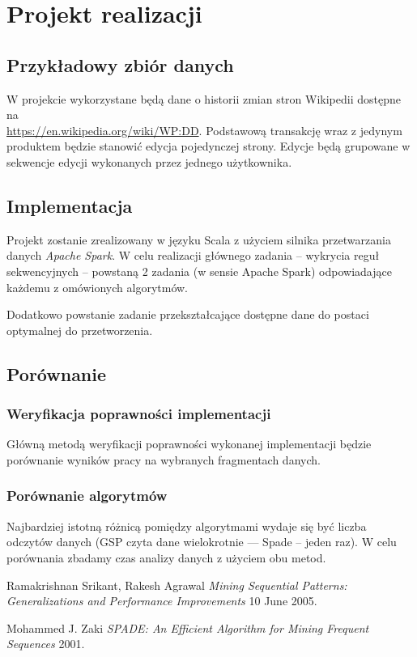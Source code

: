 \documentclass[paper=a4, fontsize=11pt]{scrartcl} %
\numberwithin{equation}{section} %
\numberwithin{figure}{section} %
\numberwithin{table}{section} %
\begin{document}
\section{Projekt realizacji}
\subsection{Przykładowy zbiór danych}
W projekcie wykorzystane będą dane o historii zmian stron Wikipedii dostępne na \\\hyperref[AA]{https://en.wikipedia.org/wiki/WP:DD}.
Podstawową transakcję wraz z jedynym produktem będzie stanowić edycja pojedynczej strony. Edycje będą grupowane w sekwencje edycji wykonanych przez jednego użytkownika.

\subsection{Implementacja}
Projekt zostanie zrealizowany w języku Scala z użyciem silnika przetwarzania danych \emph{Apache Spark}.
W celu realizacji głównego zadania -- wykrycia reguł sekwencyjnych -- powstaną 2 zadania (w sensie Apache Spark) odpowiadające każdemu z omówionych algorytmów.

Dodatkowo powstanie zadanie przekształcające dostępne dane do postaci optymalnej do przetworzenia.

\subsection{Porównanie}
\subsubsection{Weryfikacja poprawności implementacji}
Główną metodą weryfikacji poprawności wykonanej implementacji będzie porównanie wyników pracy na wybranych fragmentach danych.

\subsubsection{Porównanie algorytmów}
Najbardziej istotną różnicą pomiędzy algorytmami wydaje się być liczba odczytów danych (GSP czyta dane wielokrotnie --- Spade -- jeden raz).
W celu porównania zbadamy czas analizy danych z użyciem obu metod.

\renewcommand{\refname}{Bibliografia}

  \begin{thebibliography}{1}

   Ramakrishnan Srikant, Rakesh Agrawal {\em Mining Sequential Patterns: Generalizations and Performance Improvements} 10 June 2005.

   Mohammed J. Zaki {\em SPADE: An Efficient Algorithm for Mining Frequent Sequences} 2001.

  \end{thebibliography}
\end{document}
